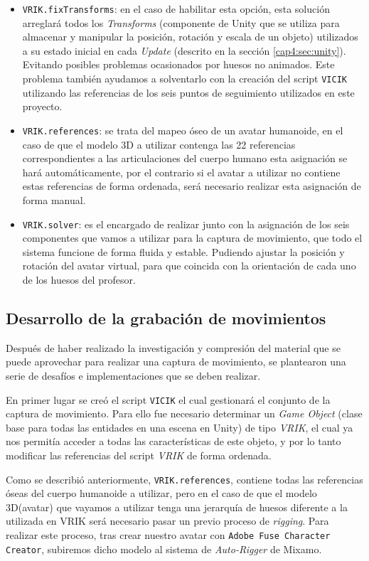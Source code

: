 \begin{itemize}
    \item \texttt{VRIK.fixTransforms}: en el caso de habilitar esta opción, esta solución arreglará todos los \textit{Transforms} (componente de Unity que se utiliza para almacenar y manipular la posición, rotación y escala de un objeto) utilizados a su estado inicial en cada \textit{Update} (descrito en la sección \ref{cap4:sec:unity}). Evitando posibles problemas ocasionados por huesos no animados. Este problema también ayudamos a solventarlo con la creación del script \texttt{VICIK} utilizando las referencias de los seis puntos de seguimiento utilizados en este proyecto.
    \item \texttt{VRIK.references}: se trata del mapeo óseo de un avatar humanoide, en el caso de que el modelo 3D a utilizar contenga las 22 referencias correspondientes a las articulaciones del cuerpo humano esta asignación se hará automáticamente, por el contrario si el avatar a utilizar no contiene estas referencias de forma ordenada, será necesario realizar esta asignación de forma manual.
    \item \texttt{VRIK.solver}: es el encargado de realizar junto con la asignación de los seis componentes que vamos a utilizar para la captura de movimiento, que todo el sistema funcione de forma fluida y estable. Pudiendo ajustar la posición y rotación del avatar virtual, para que coincida con la orientación de cada uno de los huesos del profesor.
\end{itemize}

\subsection{Desarrollo de la grabación de movimientos}

Después de haber realizado la investigación y compresión del material que se puede aprovechar para realizar una captura de movimiento, se plantearon una serie de desafíos e implementaciones que se deben realizar.

En primer lugar se creó el script \texttt{VICIK} el cual gestionará el conjunto de la captura de movimiento. Para ello fue necesario determinar un \textit{Game Object} (clase base para todas las entidades en una escena en Unity) de tipo \textit{VRIK}, el cual ya nos permitía acceder a todas las características de este objeto, y por lo tanto modificar las referencias del script \textit{VRIK} de forma ordenada.

Como se describió anteriormente, \texttt{VRIK.references}, contiene todas las referencias óseas del cuerpo humanoide a utilizar, pero en el caso de que el modelo 3D(avatar) que vayamos a utilizar tenga una jerarquía de huesos diferente a la utilizada en VRIK será necesario pasar un previo proceso de \textit{rigging}. Para realizar este proceso, tras crear nuestro avatar con \texttt{Adobe Fuse Character Creator}, subiremos dicho modelo al sistema de \textit{Auto-Rigger} de Mixamo.

